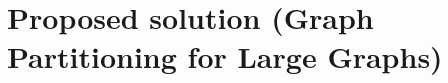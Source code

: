 %
%
\let\textcircled=\pgftextcircled
\chapter{Proposed solution (Graph Partitioning for Large Graphs)}
\label{Chapter3}

